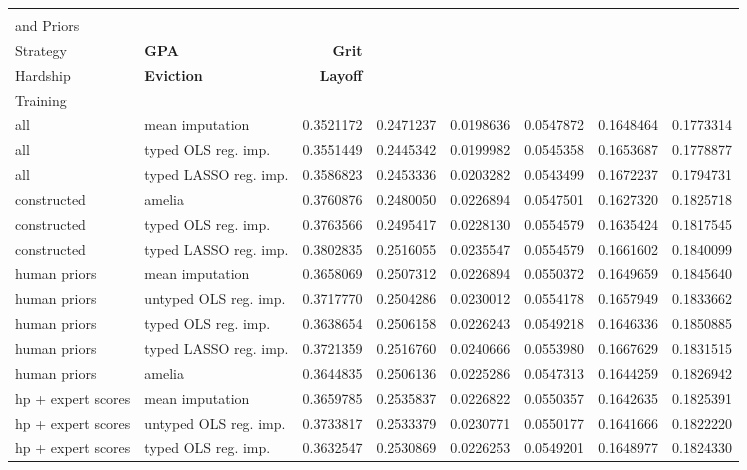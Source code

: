
\begin{tabular}{l|l|rrr|rrr}
\toprule
\textbf{\pbox{25cm}{Variables \\ and Priors}} & \textbf{\pbox{25cm}{Imputation \\ Strategy}}          & \textbf{GPA}        & \textbf{Grit} & \textbf{\pbox{25cm}{Material \\ Hardship}}       & \textbf{Eviction} & \textbf{Layoff}      & \textbf{\pbox{25cm}{Job \\ Training}} \\
\midrule
all & mean imputation & 0.3521172 & 0.2471237 & 0.0198636 & 0.0547872 & 0.1648464 & 0.1773314\\
all & typed OLS reg. imp. & 0.3551449 & 0.2445342 & 0.0199982 & 0.0545358 & 0.1653687 & 0.1778877\\
all & typed LASSO reg. imp. & 0.3586823 & 0.2453336 & 0.0203282 & 0.0543499 & 0.1672237 & 0.1794731\\
constructed & amelia & 0.3760876 & 0.2480050 & 0.0226894 & 0.0547501 & 0.1627320 & 0.1825718\\
constructed & typed OLS reg. imp. & 0.3763566 & 0.2495417 & 0.0228130 & 0.0554579 & 0.1635424 & 0.1817545\\
constructed & typed LASSO reg. imp. & 0.3802835 & 0.2516055 & 0.0235547 & 0.0554579 & 0.1661602 & 0.1840099\\
human priors & mean imputation & 0.3658069 & 0.2507312 & 0.0226894 & 0.0550372 & 0.1649659 & 0.1845640\\
human priors & untyped OLS reg. imp. & 0.3717770 & 0.2504286 & 0.0230012 & 0.0554178 & 0.1657949 & 0.1833662\\
human priors & typed OLS reg. imp. & 0.3638654 & 0.2506158 & 0.0226243 & 0.0549218 & 0.1646336 & 0.1850885\\
human priors & typed LASSO reg. imp. & 0.3721359 & 0.2516760 & 0.0240666 & 0.0553980 & 0.1667629 & 0.1831515\\
human priors & amelia & 0.3644835 & 0.2506136 & 0.0225286 & 0.0547313 & 0.1644259 & 0.1826942\\
hp + expert scores & mean imputation & 0.3659785 & 0.2535837 & 0.0226822 & 0.0550357 & 0.1642635 & 0.1825391\\
hp + expert scores & untyped OLS reg. imp. & 0.3733817 & 0.2533379 & 0.0230771 & 0.0550177 & 0.1641666 & 0.1822220\\
hp + expert scores & typed OLS reg. imp. & 0.3632547 & 0.2530869 & 0.0226253 & 0.0549201 & 0.1648977 & 0.1824330\\

\end{tabular}
